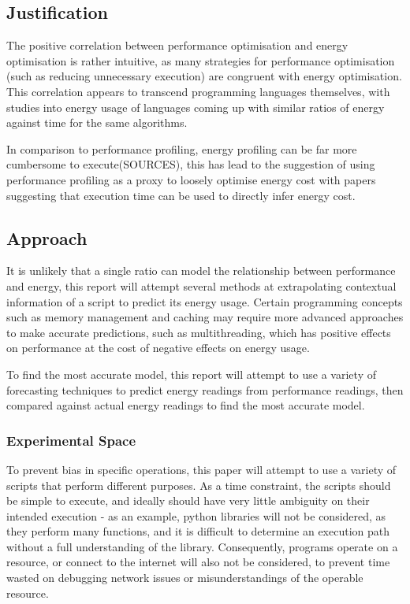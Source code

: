 \subsection{Justification}\label{subsec:justification}
The positive correlation between performance optimisation and energy optimisation is rather intuitive, as many
strategies for performance optimisation (such as reducing unnecessary execution) are congruent with energy optimisation.
This correlation appears to transcend programming languages themselves, with studies into energy usage of languages
coming up with similar ratios of energy against time for the same algorithms\cite{EnergyEfficiencyAcrossProgrammingLanguages}.

In comparison to performance profiling, energy profiling can be far more cumbersome to execute(SOURCES), this has lead to the
suggestion of using performance profiling as a proxy to loosely optimise energy cost\cite{PerformanceVEnergyMobile} with
papers suggesting that execution time can be used to directly infer energy cost\cite{ExecutionTimeVsEnergyCost}.

\subsection{Approach}\label{subsec:approach}
It is unlikely that a single ratio can model the relationship between performance and energy, this report will attempt
several methods at extrapolating contextual information of a script to predict its energy usage.
Certain programming concepts such as memory management and caching may require more advanced approaches to make accurate
predictions, such as multithreading, which has positive effects on performance at the cost of negative effects on energy
usage\cite{MultithreadingEnergy}.

To find the most accurate model, this report will attempt to use a variety of forecasting techniques to predict energy
readings from performance readings, then compared against actual energy readings to find the most accurate model.

\subsubsection{Experimental Space}
To prevent bias in specific operations, this paper will attempt to use a variety of scripts that perform different
purposes.
As a time constraint, the scripts should be simple to execute, and ideally should have very little ambiguity on their
intended execution - as an example, python libraries will not be considered, as they perform many functions, and it is
difficult to determine an execution path without a full understanding of the library.
Consequently, programs operate on a resource, or connect to the internet will also not be considered, to prevent
time wasted on debugging network issues or misunderstandings of the operable resource.

